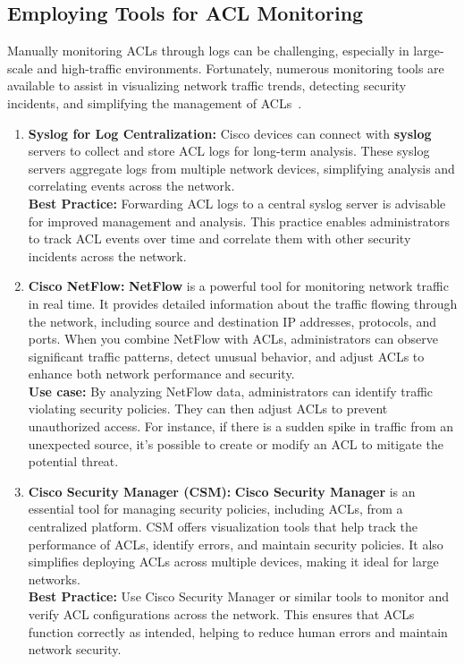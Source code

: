 \documentclass[11pt,a4paper]{article}
\begin{document}
    \subsection*{Employing Tools for ACL Monitoring}
    Manually monitoring ACLs through logs can be challenging, especially in large-scale and high-traffic environments. Fortunately, numerous monitoring tools are available to assist in visualizing network traffic trends, detecting security incidents, and simplifying the management of ACLs~\cite{Splunk}.

        \begin{enumerate}
            \item \textbf{Syslog for Log Centralization:} Cisco devices can connect with \textbf{syslog} servers to collect and store ACL logs for long-term analysis. These syslog servers aggregate logs from multiple network devices, simplifying analysis and correlating events across the network.
            \\[1em]
            \textbf{Best Practice:} Forwarding ACL logs to a central syslog server is advisable for improved management and analysis. This practice enables administrators to track ACL events over time and correlate them with other security incidents across the network.

            \item \textbf{Cisco NetFlow:} \textbf{NetFlow} is a powerful tool for monitoring network traffic in real time. It provides detailed information about the traffic flowing through the network, including source and destination IP addresses, protocols, and ports. When you combine NetFlow with ACLs, administrators can observe significant traffic patterns, detect unusual behavior, and adjust ACLs to enhance both network performance and security.
            \\[1em]
            \textbf{Use case:} By analyzing NetFlow data, administrators can identify traffic violating security policies. They can then adjust ACLs to prevent unauthorized access. For instance, if there is a sudden spike in traffic from an unexpected source, it’s possible to create or modify an ACL to mitigate the potential threat.

            \item \textbf{Cisco Security Manager (CSM):} \textbf{Cisco Security Manager} is an essential tool for managing security policies, including ACLs, from a centralized platform. CSM offers visualization tools that help track the performance of ACLs, identify errors, and maintain security policies. It also simplifies deploying ACLs across multiple devices, making it ideal for large networks.
            \\[1em]
            \textbf{Best Practice:} Use Cisco Security Manager or similar tools to monitor and verify ACL configurations across the network. This ensures that ACLs function correctly as intended, helping to reduce human errors and maintain network security.



\end{enumerate}
\end{document}
